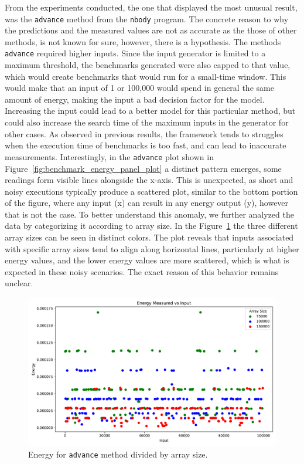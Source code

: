 From the experiments conducted, the one that displayed the most unusual result, was the \texttt{advance} method from the \texttt{nbody} program. The concrete reason to why the predictions and the measured values are not as accurate as the those of other methods, is not known for sure, however, there is a hypothesis. The methods \texttt{advance} required higher inputs. Since the input generator is limited to a maximum threshold, the benchmarks generated were also capped to that value, which would create benchmarks that would run for a small-time window. 
This would make that an input of 1 or 100,000 would spend in general the same amount of energy, making the input a bad decision factor for the model. Increasing the input could lead to a better model for this particular method, but could also increase the search time of the maximum inputs in the generator for other cases.
As observed in previous results, the framework tends to struggles when the execution time of benchmarks is too fast, and can lead to inaccurate measurements. 
Interestingly, in the \texttt{advance} plot shown in Figure~\ref{fig:benchmark_energy_panel_plot} a distinct pattern emerges, some readings form visible lines alongside the x-axis. This is unexpected, as short and noisy executions typically produce a scattered plot, similar to the bottom portion of the figure, where any input (x) can result in any energy output (y), however that is not the case. To better understand this anomaly, we further analyzed the data by categorizing it according to array size. 
In the Figure~\ref{fig:advance_analysis} the three different array sizes can be seen in distinct colors. The plot reveals that inputs associated with specific array sizes tend to align along horizontal lines, particularly at higher energy values, and the lower energy values are more scattered, which is what is expected in these noisy scenarios. The exact reason of this behavior remains unclear.



\begin{figure}[htbp]
  \centering
  \includegraphics[width = 1 \textwidth]{figures/advance_analysis.pdf}
  \caption{Energy for \texttt{advance} method divided by array size.}
  \label{fig:advance_analysis}
\end{figure}






